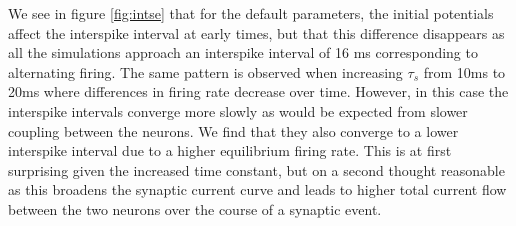 \documentclass{article}
\begin{document}
We see in figure \ref{fig:intse} that for the default parameters, the initial potentials affect the interspike interval at early times, but that this difference disappears as all the simulations approach an interspike interval of 16 ms corresponding to alternating firing. The same pattern is observed when increasing $\tau_s$ from 10ms to 20ms where differences in firing rate decrease over time. However, in this case the interspike intervals converge more slowly as would be expected from slower coupling between the neurons. We find that they also converge to a lower interspike interval due to a higher equilibrium firing rate. This is at first surprising given the increased time constant, but on a second thought reasonable as this broadens the synaptic current curve and leads to higher total current flow between the two neurons over the course of a synaptic event.
\end{document}

